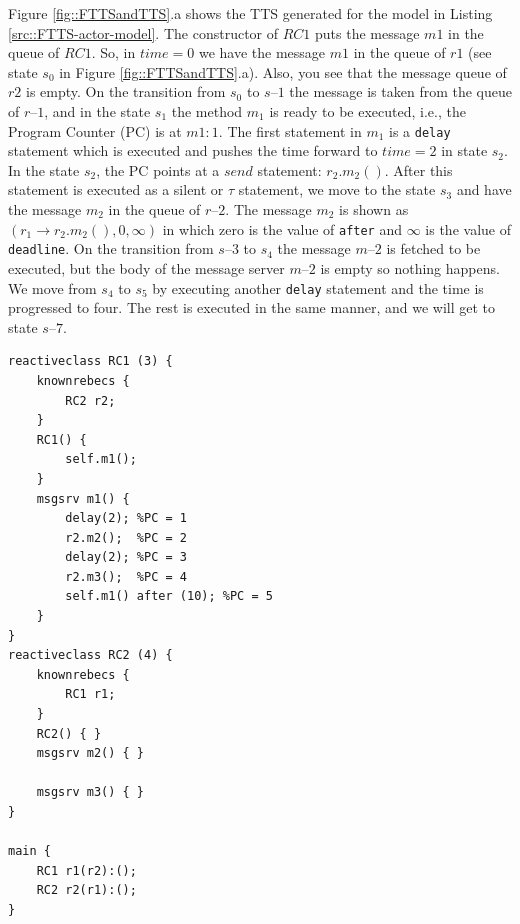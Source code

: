 Figure \ref{fig::FTTSandTTS}.a shows the TTS generated for the model in Listing \ref{src::FTTS-actor-model}. 
The constructor of $RC1$ puts the message $m1$ in the queue of $RC1$. So, in $time=0$ we have the message $m1$ in the queue of $r1$ (see state $s_0$ in Figure \ref{fig::FTTSandTTS}.a). Also, you see that the message queue of $r2$ is empty. On the transition from $s_0$ to $s–1$ the message is taken from the queue of $r–1$, and in the state $s_1$ the method $m_1$ is ready to be executed, i.e., the Program Counter (PC) is at $m1:1$. The first statement in $m_1$ is a \texttt{delay} statement which is executed and pushes the time forward to $time=2$ in state $s_2$.
In the state $s_2$, the PC points at a $send$ statement: $r_2.m_2()$. After this statement is executed as a silent or $\tau$ statement, we move to the state $s_3$ and have the message $m_2$ in the queue of $r–2$. The message $m_2$ is shown as $(r_1 \rightarrow r_2.m_2(), 0, \infty)$ in which zero is the value of \texttt{after} and $\infty$ is the value of \texttt{deadline}.
On the transition from $s–3$ to $s_4$ the message $m–2$ is fetched to be executed, but the body of the message server $m–2$ is empty so nothing happens. We move from $s_4$ to $s_5$ by executing another \texttt{delay} statement and the time is progressed to four.
The rest is executed in the same manner, and we will get to state $s–7$.

\begin{lstlisting}[language=rebeca, caption= A simple Timed Rebeca model with two rebecs, label=src::FTTS-actor-model]
reactiveclass RC1 (3) {
	knownrebecs {
		RC2 r2;
	}
	RC1() {
		self.m1();
	}
	msgsrv m1() {
		delay(2); %PC = 1
		r2.m2();  %PC = 2 
		delay(2); %PC = 3 
		r2.m3();  %PC = 4
		self.m1() after (10); %PC = 5
	}
}
reactiveclass RC2 (4) {
	knownrebecs {
		RC1 r1;
	}
	RC2() { }
	msgsrv m2() { }
	
	msgsrv m3() { }
}

main {
	RC1 r1(r2):();
	RC2 r2(r1):();
}

\end{lstlisting}

